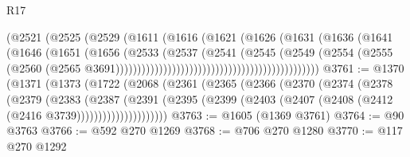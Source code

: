 \begin{lexlean}{R17}
\begin{coremodule}
                                                      (@2521
                                                        (@2525
                                                          (@2529
                                                            (@1611
                                                              (@1616
                                                                (@1621
                                                                  (@1626
                                                                    (@1631
                                                                      (@1636
                                                                        (@1641
                                                                          (@1646
                                                                            (@1651
                                                                              (@1656
                                                                                (@2533
                                                                                  (@2537
                                                                                    (@2541
                                                                                      (@2545
                                                                                        (@2549
                                                                                          (@2554
                                                                                            (@2555
                                                                                              (@2560
                                                                                                (@2565
                                                                                                  @3691)))))))))))))))))))))))))))))))))))))))))))))))
@3761 := @1370
    (@1371
      (@1373
        (@1722
          (@2068
            (@2361
              (@2365
                (@2366
                  (@2370
                    (@2374
                      (@2378
                        (@2379
                          (@2383
                            (@2387
                              (@2391
                                (@2395
                                  (@2399
                                    (@2403 (@2407 (@2408 (@2412 (@2416 @3739)))))))))))))))))))))
@3763 := @1605 (@1369 @3761)
@3764 := @90 @3763
@3766 := @592 @270 @1269
@3768 := @706 @270 @1280
@3770 := @117 @270 @1292

\end{coremodule}
\end{lexlean}
